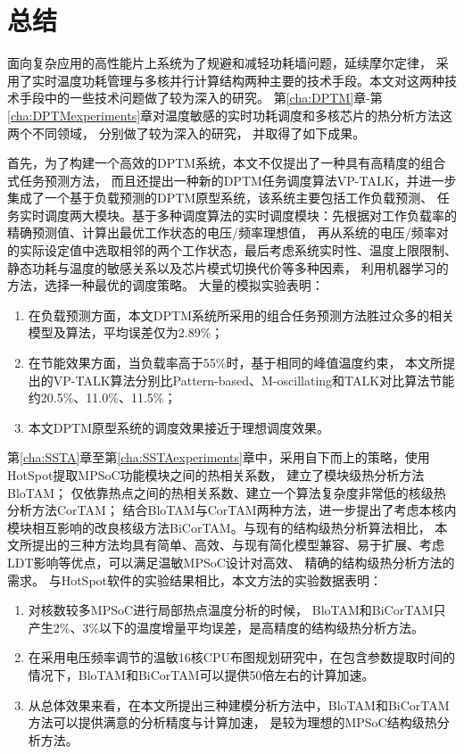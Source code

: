 

\chapter{总结}
\label{cha:Conclusion}

面向复杂应用的高性能片上系统为了规避和减轻功耗墙问题，延续摩尔定律， 采用了实时温度功耗管理与多核并行计算结构两种主要的技术手段。本文对这两种技术手段中的一些技术问题做了较为深入的研究。
第\ref{cha:DPTM}章-第\ref{cha:DPTMexperiments}章对温度敏感的实时功耗调度和多核芯片的热分析方法这两个不同领域， 分别做了较为深入的研究， 并取得了如下成果。

首先，为了构建一个高效的DPTM系统，本文不仅提出了一种具有高精度的组合式任务预测方法， 而且还提出一种新的DPTM任务调度算法VP-TALK，并进一步集成了一个基于负载预测的DPTM原型系统，该系统主要包括工作负载预测、 任务实时调度两大模块。基于多种调度算法的实时调度模块：先根据对工作负载率的精确预测值、计算出最优工作状态的电压/频率理想值， 再从系统的电压/频率对的实际设定值中选取相邻的两个工作状态，最后考虑系统实时性、温度上限限制、 静态功耗与温度的敏感关系以及芯片模式切换代价等多种因素， 利用机器学习的方法，选择一种最优的调度策略。
大量的模拟实验表明：
\begin{enumerate}[1)]
\item 在负载预测方面，本文DPTM系统所采用的组合任务预测方法胜过众多的相关模型及算法，平均误差仅为2.89\%；
\item 在节能效果方面，当负载率高于55\%时，基于相同的峰值温度约束， 本文所提出的VP-TALK算法分别比Pattern-based、M-oscillating和TALK对比算法节能约20.5\%、11.0\%、11.5\%； 
\item 本文DPTM原型系统的调度效果接近于理想调度效果。
\end{enumerate}

第\ref{cha:SSTA}章至第\ref{cha:SSTAexperiments}章中，采用自下而上的策略，使用HotSpot提取MPSoC功能模块之间的热相关系数， 建立了模块级热分析方法BloTAM； 仅依靠热点之间的热相关系数、建立一个算法复杂度非常低的核级热分析方法CorTAM； 结合BloTAM与CorTAM两种方法，进一步提出了考虑本核内模块相互影响的改良核级方法BiCorTAM。与现有的结构级热分析算法相比， 本文所提出的三种方法均具有简单、高效、与现有简化模型兼容、易于扩展、考虑LDT影响等优点，可以满足温敏MPSoC设计对高效、 精确的结构级热分析方法的需求。
与HotSpot软件的实验结果相比，本文方法的实验数据表明：
\begin{enumerate}[1)]
\item 对核数较多MPSoC进行局部热点温度分析的时候， BloTAM和BiCorTAM只产生2\%、3\%以下的温度增量平均误差，是高精度的结构级热分析方法。
\item 在采用电压频率调节的温敏16核CPU布图规划研究中，在包含参数提取时间的情况下，BloTAM和BiCorTAM可以提供50倍左右的计算加速。
\item 从总体效果来看，在本文所提出三种建模分析方法中，BloTAM和BiCorTAM方法可以提供满意的分析精度与计算加速， 是较为理想的MPSoC结构级热分析方法。
\end{enumerate}